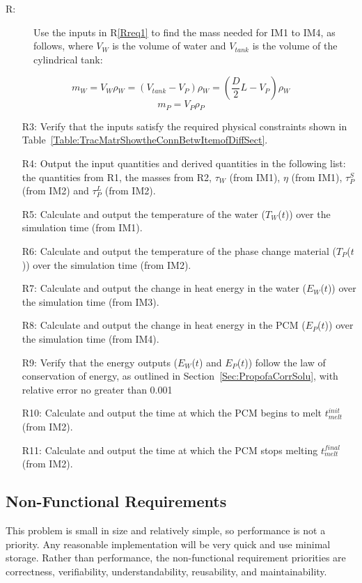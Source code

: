\documentclass[12pt]{article}
\newcounter{reqnum}
\newcommand{\rthereqnum}{R\thereqnum}
\begin{document}
\begin{description}
\item[\rthereqnum\label{Rreq2}:]Use the inputs in R\ref{Rreq1} to find the mass needed for IM1 to IM4, as follows, where $V_{W}$ is the volume of water and $V_{tank}$ is the volume of the cylindrical tank:
\end{description}
\begin{equation}
m_{W}=V_{W}\rho{}_{W}=\left(V_{tank}-V_{P}\right)\rho{}_{W}=\left(\frac{D}{2}L-V_{P}\right)\rho{}_{W}
\end{equation}
\begin{equation}
m_{P}=V_{P}\rho{}_{P}
\end{equation}
\begin{itemize}
\item[R3:]Verify that the inputs satisfy the required physical constraints shown in Table~\ref{Table:TracMatrShowtheConnBetwItemofDiffSect}.
\item[R4:]Output the input quantities and derived quantities in the following list: the quantities from R1, the masses from R2, $\tau{}_{W}$ (from IM1), $\eta{}$ (from IM1), $\tau{}_{P}^{S}$ (from IM2) and $\tau{}_{P}^{L}$ (from IM2).
\item[R5:]Calculate and output the temperature of the water ($T_{W}$($t$)) over the simulation time (from IM1).
\item[R6:]Calculate and output the temperature of the phase change material ($T_{P}$($t$)) over the simulation time (from IM2).
\item[R7:]Calculate and output the change in heat energy in the water ($E_{W}$($t$)) over the simulation time (from IM3).
\item[R8:]Calculate and output the change in heat energy in the PCM ($E_{P}$($t$)) over the simulation time (from IM4).
\item[R9:]Verify that the energy outputs ($E_{W}$($t$) and $E_{P}$($t$)) follow the law of conservation of energy, as outlined in Section~\ref{Sec:PropofaCorrSolu}, with relative error no greater than 0.001%
\item[R10:]Calculate and output the time at which the PCM begins to melt $t_{melt}^{init}$ (from IM2).
\item[R11:]Calculate and output the time at which the PCM stops melting $t_{melt}^{final}$ (from IM2).
\end{itemize}
\subsection{Non-Functional Requirements}
\label{Sec:Non-Requ}
This problem is small in size and relatively simple, so performance is not a priority. Any reasonable implementation will be very quick and use minimal storage. Rather than performance, the non-functional requirement priorities are correctness, verifiability, understandability, reusability, and maintainability.
\end{document}
